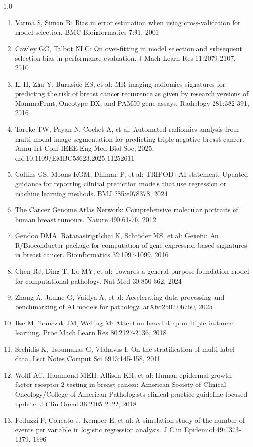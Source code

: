 \documentclass[11pt,a4paper]{article}
\begin{document}
\begin{spacing}{1.0}
\begin{enumerate}
\item Varma S, Simon R: Bias in error estimation when using cross-validation for model selection. BMC Bioinformatics 7:91, 2006
\item Cawley GC, Talbot NLC: On over-fitting in model selection and subsequent selection bias in performance evaluation. J Mach Learn Res 11:2079-2107, 2010
\item Li H, Zhu Y, Burnside ES, et al: MR imaging radiomics signatures for predicting the risk of breast cancer recurrence as given by research versions of MammaPrint, Oncotype DX, and PAM50 gene assays. Radiology 281:382-391, 2016
\item Tareke TW, Payan N, Cochet A, et al: Automated radiomics analysis from multi-modal image segmentation for predicting triple negative breast cancer. Annu Int Conf IEEE Eng Med Biol Soc, 2025. doi:10.1109/EMBC58623.2025.11252611
\item Collins GS, Moons KGM, Dhiman P, et al: TRIPOD+AI statement: Updated guidance for reporting clinical prediction models that use regression or machine learning methods. BMJ 385:e078378, 2024
\item The Cancer Genome Atlas Network: Comprehensive molecular portraits of human breast tumours. Nature 490:61-70, 2012
\item Gendoo DMA, Ratanasirigulchai N, Schr\"oder MS, et al: Genefu: An R/Bioconductor package for computation of gene expression-based signatures in breast cancer. Bioinformatics 32:1097-1099, 2016
\item Chen RJ, Ding T, Lu MY, et al: Towards a general-purpose foundation model for computational pathology. Nat Med 30:850-862, 2024
\item Zhang A, Jaume G, Vaidya A, et al: Accelerating data processing and benchmarking of AI models for pathology. arXiv:2502.06750, 2025
\item Ilse M, Tomczak JM, Welling M: Attention-based deep multiple instance learning. Proc Mach Learn Res 80:2127-2136, 2018
\item Sechidis K, Tsoumakas G, Vlahavas I: On the stratification of multi-label data. Lect Notes Comput Sci 6913:145-158, 2011
\item Wolff AC, Hammond MEH, Allison KH, et al: Human epidermal growth factor receptor 2 testing in breast cancer: American Society of Clinical Oncology/College of American Pathologists clinical practice guideline focused update. J Clin Oncol 36:2105-2122, 2018
\item Peduzzi P, Concato J, Kemper E, et al: A simulation study of the number of events per variable in logistic regression analysis. J Clin Epidemiol 49:1373-1379, 1996

\end{enumerate}
\end{spacing}
\end{document}
